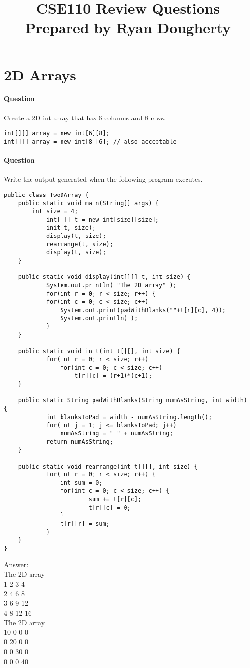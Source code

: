 \documentclass{article}
\date{}
\begin{document}
\title{\textbf{CSE110 Review Questions \\
Prepared by Ryan Dougherty}}
\maketitle

\section*{2D Arrays}


\setcounter{question_num}{1}
\paragraph{Question }
Create a 2D int array that has 6 columns and 8 rows.
\begin{lstlisting}
int[][] array = new int[6][8];
int[][] array = new int[8][6]; // also acceptable
\end{lstlisting}

\addtocounter{question_num}{1}
\paragraph{Question }
Write the output generated when the following program executes.
\begin{lstlisting}
public class TwoDArray {
	public static void main(String[] args) {
		int size = 4;
    		int[][] t = new int[size][size];
    		init(t, size);
    		display(t, size);
    		rearrange(t, size);
    		display(t, size);
  	}

  	public static void display(int[][] t, int size) {
    		System.out.println( "The 2D array" );
    		for(int r = 0; r < size; r++) {
			for(int c = 0; c < size; c++)
				System.out.print(padWithBlanks(""+t[r][c], 4));
      			System.out.println( );
    		}
  	}

  	public static void init(int t[][], int size) {
    		for(int r = 0; r < size; r++)
      			for(int c = 0; c < size; c++)
       				t[r][c] = (r+1)*(c+1);
  	}

  	public static String padWithBlanks(String numAsString, int width) {
    		int blanksToPad = width - numAsString.length();
    		for(int j = 1; j <= blanksToPad; j++)
      			numAsString = " " + numAsString;
    		return numAsString;
  	}

  	public static void rearrange(int t[][], int size) {
    		for(int r = 0; r < size; r++) {
      			int sum = 0;
      			for(int c = 0; c < size; c++) {
        				sum += t[r][c];
        				t[r][c] = 0;
      			}
      			t[r][r] = sum;
    		}
  	}
}
\end{lstlisting}

{\color{red}Answer: \\
The 2D array \\
   1   2   3   4\\
   2   4   6   8\\
   3   6   9  12\\
   4   8  12  16\\
The 2D array\\
  10   0   0   0\\
   0  20   0   0\\
   0   0  30   0\\
   0   0   0  40\\
}
\end{document}
